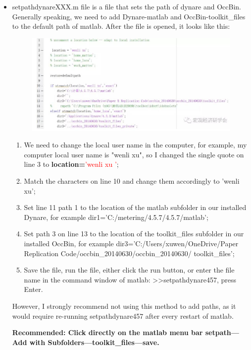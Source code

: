 \documentclass[10pt,math=newtx,citestyle=gb7714-2015,bibstyle=gb7714-2015]{elegantbook}
\begin{document}
{\begin{itemize}
	\item 
	setpathdynareXXX.m file is a file that sets the path of dynare and OccBin. Generally speaking, we need to add Dynare-matlab and OccBin-toolkit\_files to the default path of matlab. After the file is opened, it looks like this:
	\begin{figure}[htbp!]
		\centering
		\includegraphics[width=0.8\linewidth]{FIG/setpathoccbin}
		\centering
	\end{figure}
	\begin{enumerate}
		\item We need to change the local user name in the computer, for example, my computer local user name is "wenli xu", so I changed the single quote on line 3 to \textbf{location=}\textcolor{red}{'wenli xu '};
		\item Match the characters on line 10 and change them accordingly to 'wenli xu';
		\item Set line 11 path 1 to the location of the matlab subfolder in our installed Dynare, for example dir1='C:/metering/4.5.7/4.5.7/matlab';
		\item Set path 3 on line 13 to the location of the toolkit\_files subfolder in our installed OccBin, for example dir3='C:/Users/xuwen/OneDrive/Paper Replication Code/occbin\_20140630/occbin\_20140630/ toolkit\_files';
		\item Save the file, run the file, either click the run button, or enter the file name in the command window of matlab: >>setpathdynare457, press Enter.
	\end{enumerate}
	
	However, I strongly recommend not using this method to add paths, as it would require re-running setpathdynare457 after every restart of matlab.
	
	\textbf{Recommended: Click directly on the matlab menu bar setpath---Add with Subfolders---toolkit\_files---save.}
\end{itemize}

}
\end{document}
